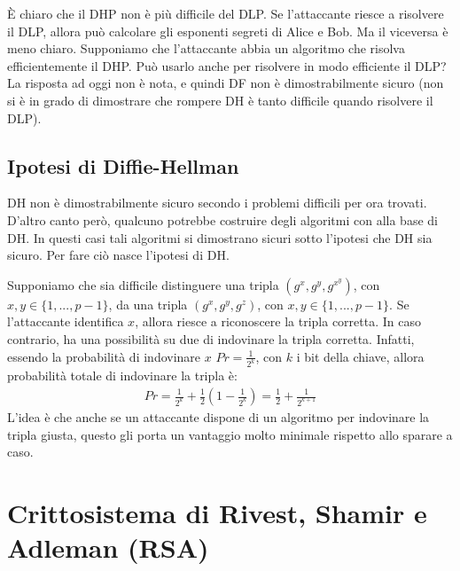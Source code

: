 \noindent È chiaro che il DHP non è più difficile del DLP. Se l'attaccante riesce a risolvere il DLP, allora può calcolare gli esponenti segreti di Alice e Bob. Ma il viceversa è meno chiaro. Supponiamo che l'attaccante abbia un algoritmo che risolva efficientemente il DHP. Può usarlo anche per risolvere in modo efficiente il DLP? La risposta ad oggi non è nota, e quindi DF non è dimostrabilmente sicuro (non si è in grado di dimostrare che rompere DH è tanto difficile quando risolvere il DLP).\\

\subsection{Ipotesi di Diffie-Hellman}
DH non è dimostrabilmente sicuro secondo i problemi difficili per ora trovati. D'altro canto però, qualcuno potrebbe costruire degli algoritmi con alla base di DH. In questi casi tali algoritmi si dimostrano sicuri sotto l'ipotesi che DH sia sicuro. Per fare ciò nasce l'ipotesi di DH.

Supponiamo che sia difficile distinguere una tripla $(g^x, g^y, g^x^y)$, con $x, y \in \{1, ..., p-1\}$, da una tripla $(g^x, g^y, g^z)$, con $x, y \in \{1, ..., p-1\}$. Se l'attaccante identifica $x$, allora riesce a riconoscere la tripla corretta. In caso contrario, ha una possibilità su due di indovinare la tripla corretta. Infatti, essendo la probabilità di indovinare $x$ $Pr=\frac{1}{2^k}$, con $k$ i bit della chiave, allora probabilità totale di indovinare la tripla è:
\begin{align*}
    Pr = \frac{1}{2^k} + \frac{1}{2} (1 - \frac{1}{2^k}) = \frac{1}{2} + \frac{1}{2^{k+1}}
\end{align*}
\noindent L'idea è che anche se un attaccante dispone di un algoritmo per indovinare la tripla giusta, questo gli porta un vantaggio molto minimale rispetto allo sparare a caso.

\section{Crittosistema di Rivest, Shamir e Adleman (RSA)}

